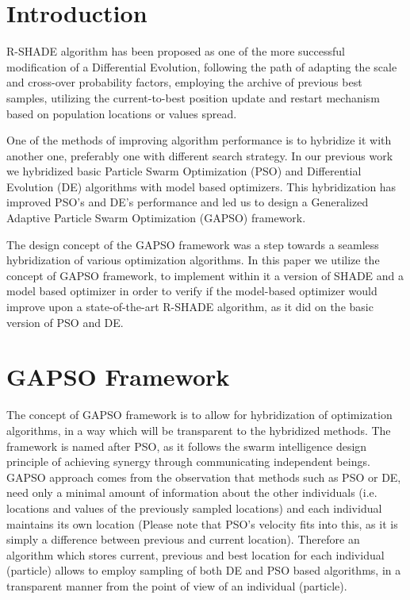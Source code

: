 \documentclass[manuscript]{acmart}
\begin{document}

\maketitle

\section{Introduction}

R-SHADE \cite{Tanabe2014} algorithm has been proposed as one of the more successful
modification of a Differential Evolution, following the path of adapting the scale
and cross-over probability factors, employing the archive of previous best samples,
utilizing the current-to-best position update and restart mechanism based on population
locations or values spread.

One of the methods of improving algorithm performance is to hybridize it with another
one, preferably one with different search strategy.
In our previous work we hybridized basic Particle Swarm Optimization (PSO) and Differential Evolution (DE) algorithms with model based optimizers.
This hybridization has improved PSO's and DE's performance \cite{zaborski2019generalized,zaborski2020analysis,Okulewicz2020} and led us to design a Generalized Adaptive Particle Swarm Optimization (GAPSO) framework\cite{ulinski2018generalized,Okulewicz2020}.

The design concept of the GAPSO framework was a step towards a seamless hybridization
of various optimization algorithms.
In this paper we utilize the concept of GAPSO framework, to implement within it a version of SHADE \cite{Tanabe2014} and a model based optimizer \cite{zaborski2020analysis} in order to verify if the model-based optimizer
would improve upon a state-of-the-art R-SHADE algorithm, as it did on
the basic version of PSO and DE.
%
\section{GAPSO Framework}
The concept of GAPSO framework is to allow for hybridization of optimization algorithms,
in a way which will be transparent to the hybridized methods.
The framework is named after PSO, as it follows the swarm intelligence design principle
of achieving synergy through communicating independent beings.
GAPSO approach comes from the observation that methods such as PSO or DE,
need only a minimal amount of information about the other individuals (i.e. locations and values of the previously sampled locations) and each individual maintains its own
location (Please note that PSO's velocity fits into this, as it is simply a difference between previous and current location).
Therefore an algorithm which stores current, previous and best location
for each individual (particle) allows to employ sampling of both DE and PSO
based algorithms, in a transparent manner from the point of view of an individual (particle).
\end{document}
